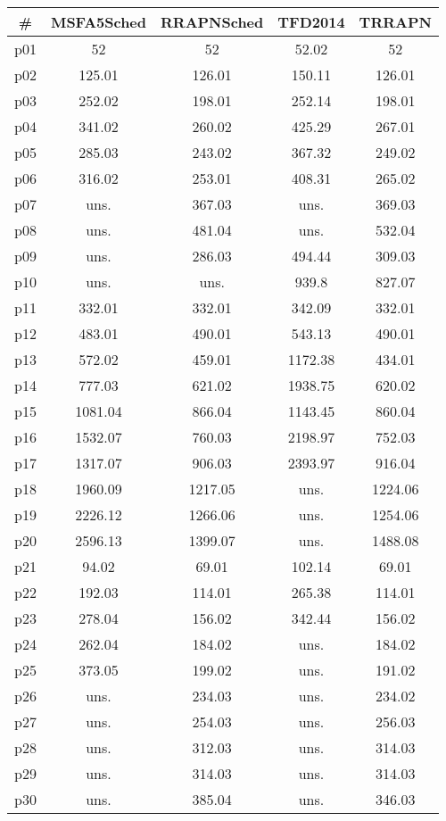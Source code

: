 \begin{tabular}{ccccc}
\toprule
\textbf{\#} & \textbf{MSFA5Sched} & \textbf{RRAPNSched} & \textbf{TFD2014} & \textbf{TRRAPN}\\
\midrule
p01 & 52 & 52 & 52.02 & 52\\
p02 & 125.01 & 126.01 & 150.11 & 126.01\\
p03 & 252.02 & 198.01 & 252.14 & 198.01\\
p04 & 341.02 & 260.02 & 425.29 & 267.01\\
p05 & 285.03 & 243.02 & 367.32 & 249.02\\
p06 & 316.02 & 253.01 & 408.31 & 265.02\\
p07 & uns. & 367.03 & uns. & 369.03\\
p08 & uns. & 481.04 & uns. & 532.04\\
p09 & uns. & 286.03 & 494.44 & 309.03\\
p10 & uns. & uns. & 939.8 & 827.07\\
p11 & 332.01 & 332.01 & 342.09 & 332.01\\
p12 & 483.01 & 490.01 & 543.13 & 490.01\\
p13 & 572.02 & 459.01 & 1172.38 & 434.01\\
p14 & 777.03 & 621.02 & 1938.75 & 620.02\\
p15 & 1081.04 & 866.04 & 1143.45 & 860.04\\
p16 & 1532.07 & 760.03 & 2198.97 & 752.03\\
p17 & 1317.07 & 906.03 & 2393.97 & 916.04\\
p18 & 1960.09 & 1217.05 & uns. & 1224.06\\
p19 & 2226.12 & 1266.06 & uns. & 1254.06\\
p20 & 2596.13 & 1399.07 & uns. & 1488.08\\
p21 & 94.02 & 69.01 & 102.14 & 69.01\\
p22 & 192.03 & 114.01 & 265.38 & 114.01\\
p23 & 278.04 & 156.02 & 342.44 & 156.02\\
p24 & 262.04 & 184.02 & uns. & 184.02\\
p25 & 373.05 & 199.02 & uns. & 191.02\\
p26 & uns. & 234.03 & uns. & 234.02\\
p27 & uns. & 254.03 & uns. & 256.03\\
p28 & uns. & 312.03 & uns. & 314.03\\
p29 & uns. & 314.03 & uns. & 314.03\\
p30 & uns. & 385.04 & uns. & 346.03\\
\bottomrule
\end{tabular}

